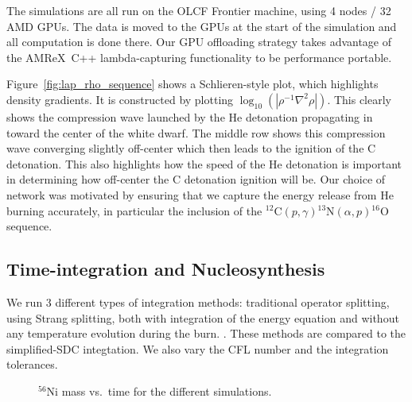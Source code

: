 \documentclass[modern]{aastex631}
\newcommand{\isot}[2]{$^{#2}\mathrm{#1}$}
\newcommand{\isotm}[2]{{}^{#2}\mathrm{#1}}
\newcommand{\amrex}{{\sf AMReX}}
\newcommand{\MarginPar}[1]{
    \marginpar{\vskip-\baselineskip%
               \raggedright%
               \tiny\sffamily%
               {\color{red}\hrule%
               \smallskip%
               #1\par%
               \smallskip%
               \hrule}}%
}
\begin{document}
The simulations are all run on the OLCF Frontier machine, using 4
nodes / 32 AMD GPUs.  The data is moved to the GPUs at the start of
the simulation and all computation is done there.  Our GPU offloading
strategy takes advantage of the \amrex\ C++ lambda-capturing
functionality to be performance portable.

\begin{figure*}[t]
\centering
{}
\caption{\label{fig:temp_sequence} Time-sequence of the SDC run showing the temperature.}
\end{figure*}

\begin{figure*}[t]
\centering
{}
\caption{\label{fig:lap_rho_sequence} Time-sequence of the SDC run showing the compression.}
\end{figure*}

Figure~\ref{fig:lap_rho_sequence} shows a Schlieren-style plot, which
highlights density gradients.  It is constructed by plotting
$\log_{10}(|\rho^{-1}\nabla^2\rho|)$.  This clearly shows the
compression wave launched by the He detonation propagating in toward
the center of the white dwarf.  The middle row shows this compression
wave converging slightly off-center which then leads to the ignition
of the C detonation.  This also highlights how the speed of the He
detonation is important in determining how off-center the C detonation
ignition will be.  Our choice of network was motivated by ensuring
that we capture the energy release from He burning accurately, in
particular the inclusion of the
$\isotm{C}{12}(p,\gamma)\isotm{N}{13}(\alpha,p)\isotm{O}{16}$
sequence.


\subsection{Time-integration and Nucleosynthesis}

We run 3 different types of integration methods: traditional operator
splitting, using Strang splitting, both with integration of the energy
equation and without any temperature evolution during the
burn.  \MarginPar{comment about the EOS}.  These methods are compared
to the simplified-SDC integtation.  We also vary the CFL number and
the integration tolerances.

\begin{figure}[t]
\centering
{}
\caption{\label{fig:ni56} \isot{Ni}{56} mass vs.\ time for the different simulations.}
\end{figure}
\end{document}
